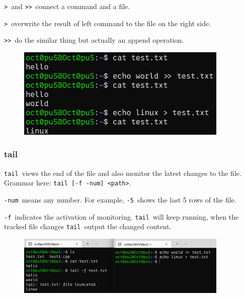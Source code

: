 \documentclass[12pt]{ctexart}
\begin{document}
\texttt{\textgreater{}}\ and \texttt{\textgreater{}\textgreater{}}\
connect a command and a file.

\texttt{\textgreater{}}\ overwrite the result of left command to the file
on the right side.

\texttt{\textgreater{}\textgreater{}}\ do the similar thing but actually
an append operation.

\begin{figure}[H]
    \centering
    \includegraphics[width=0.9\textwidth,keepaspectratio]{assets/Linux/1.5 Linux file commands/14.png}
\end{figure}

\subsubsection{\textbf{tail}}

\texttt{tail}\ views the end of the file and also monitor the latest
changes to the file. Grammar here:
\texttt{tail\ {[}-f\ -num{]}\ \textless{}path\textgreater{}}.

\texttt{-num}\ means any number. For example, \texttt{-5}\ shows the last
5 rows of the file.

\texttt{-f}\ indicates the activation of monitoring. \texttt{tail}\ will
keep running, when the tracked file changes \texttt{tail}\ output the
changed content.

\begin{figure}[H]
    \centering
    \includegraphics[width=0.9\textwidth,keepaspectratio]{assets/Linux/1.5 Linux file commands/15.png}
\end{figure}
\end{document}
